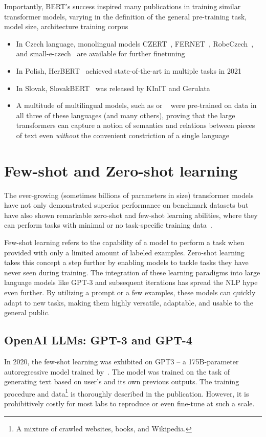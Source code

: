 Importantly, BERT's success inspired many publications in training similar transformer models, varying in the definition of the general pre-training task, model size, architecture training corpus

\begin{itemize}
    \item In Czech language, monolingual models CZERT~\cite{czert}, FERNET~\cite{fernet}, RobeCzech~\cite{straka2021robeczech}, and small-e-czech~\cite{kocian2021siamese} are available for further finetuning
    \item In Polish, HerBERT~\cite{mroczkowski-etal-2021-herbert} achieved state-of-the-art in multiple tasks in 2021
    \item In Slovak, SlovakBERT~\cite{pikuliak2021slovakbert} was released by KInIT and Gerulata
    \item A multitude of multilingual models, such as \MBERT or \XLM~\cite{xlm-roberta} were pre-trained on data in all three of these languages (and many others), proving that the large transformers can capture a notion of semantics and relations between pieces of text even \textit{without} the convenient constriction of a single language 
\end{itemize}

\section{Few-shot and Zero-shot learning}
\label{sec:llms}
The ever-growing (sometimes billions of parameters in size) transformer models have not only demonstrated superior performance on benchmark datasets but have also shown remarkable zero-shot and few-shot learning abilities, where they can perform tasks with minimal or no task-specific training data~\cite{gpt3}.

Few-shot learning refers to the capability of a model to perform a task when provided with only a limited amount of labeled examples. Zero-shot learning takes this concept a step further by enabling models to tackle tasks they have never seen during training. The integration of these learning paradigms into large language models like GPT-3 and subsequent iterations has spread the NLP hype even further. By utilizing a prompt or a few examples, these models can quickly adapt to new tasks, making them highly versatile, adaptable, and usable to the general public.
\subsection{OpenAI LLMs: GPT-3 and GPT-4}
\label{sec:gpt}
In 2020, the few-shot learning was exhibited on GPT3 -- a 175B-parameter autoregressive model trained by~\cite{gpt3}. The model was trained on the task of generating text based on user's and its own previous outputs.
The training procedure and data\footnote{A mixture of crawled websites, books, and Wikipedia.} is thoroughly described in the publication. However, it is prohibitively costly for most labs to reproduce or even fine-tune at such a scale. 

